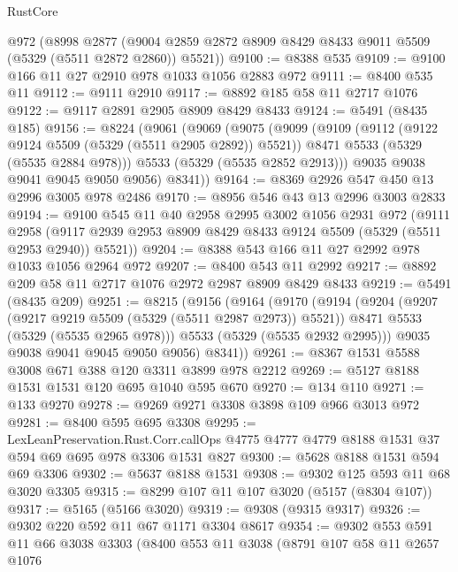 \begin{lexlean}{RustCore}
\begin{coremodule}
    @972
    (@8998
      @2877
      (@9004 @2859 @2872 @8909 @8429 @8433 @9011 @5509 (@5329 (@5511 @2872 @2860)) @5521))
@9100 := @8388 @535
@9109 := @9100 @166 @11 @27 @2910 @978 @1033 @1056 @2883 @972
@9111 := @8400 @535 @11
@9112 := @9111 @2910
@9117 := @8892 @185 @58 @11 @2717 @1076
@9122 := @9117 @2891 @2905 @8909 @8429 @8433
@9124 := @5491 (@8435 @185)
@9156 := @8224
    (@9061
      (@9069
        (@9075
          (@9099
            (@9109
              (@9112 (@9122 @9124 @5509 (@5329 (@5511 @2905 @2892)) @5521))
              @8471
              @5533
              (@5329 (@5535 @2884 @978)))
            @5533
            (@5329 (@5535 @2852 @2913)))
          @9035
          @9038
          @9041
          @9045
          @9050
          @9056)
        @8341))
@9164 := @8369 @2926 @547 @450 @13 @2996 @3005 @978 @2486
@9170 := @8956 @546 @43 @13 @2996 @3003 @2833
@9194 := @9100
    @545
    @11
    @40
    @2958
    @2995
    @3002
    @1056
    @2931
    @972
    (@9111
      @2958
      (@9117 @2939 @2953 @8909 @8429 @8433 @9124 @5509 (@5329 (@5511 @2953 @2940)) @5521))
@9204 := @8388 @543 @166 @11 @27 @2992 @978 @1033 @1056 @2964 @972
@9207 := @8400 @543 @11 @2992
@9217 := @8892 @209 @58 @11 @2717 @1076 @2972 @2987 @8909 @8429 @8433
@9219 := @5491 (@8435 @209)
@9251 := @8215
    (@9156
      (@9164
        (@9170
          (@9194
            (@9204
              (@9207 (@9217 @9219 @5509 (@5329 (@5511 @2987 @2973)) @5521))
              @8471
              @5533
              (@5329 (@5535 @2965 @978)))
            @5533
            (@5329 (@5535 @2932 @2995)))
          @9035
          @9038
          @9041
          @9045
          @9050
          @9056)
        @8341))
@9261 := @8367 @1531 @5588 @3008 @671 @388 @120 @3311 @3899 @978 @2212
@9269 := @5127 @8188 @1531 @1531 @120 @695 @1040 @595 @670
@9270 := @134 @110
@9271 := @133 @9270
@9278 := @9269 @9271 @3308 @3898 @109 @966 @3013 @972
@9281 := @8400 @595 @695 @3308
@9295 := LexLeanPreservation.Rust.Corr.callOps
    @4775
    @4777
    @4779
    @8188
    @1531
    @37
    @594
    @69
    @695
    @978
    @3306
    @1531
    @827
@9300 := @5628 @8188 @1531 @594 @69 @3306
@9302 := @5637 @8188 @1531
@9308 := @9302 @125 @593 @11 @68 @3020 @3305
@9315 := @8299 @107 @11 @107 @3020 (@5157 (@8304 @107))
@9317 := @5165 (@5166 @3020)
@9319 := @9308 (@9315 @9317)
@9326 := @9302 @220 @592 @11 @67 @1171 @3304 @8617
@9354 := @9302
    @553
    @591
    @11
    @66
    @3038
    @3303
    (@8400
      @553
      @11
      @3038
      (@8791
        @107
        @58
        @11
        @2657
        @1076

\end{coremodule}
\end{lexlean}
